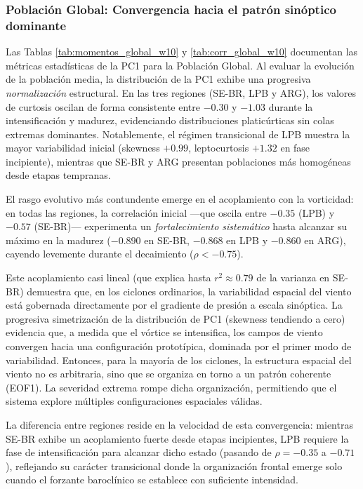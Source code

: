 \subsubsection{Población Global: Convergencia hacia el patrón sinóptico dominante}

Las Tablas \ref{tab:momentos_global_w10} y \ref{tab:corr_global_w10} documentan las métricas estadísticas de la PC1 para la Población Global. Al evaluar la evolución de la población media, la distribución de la PC1 exhibe una progresiva \textit{normalización} estructural. En las tres regiones (SE-BR, LPB y ARG), los valores de curtosis oscilan de forma consistente entre $-0.30$ y $-1.03$ durante la intensificación y madurez, evidenciando distribuciones platicúrticas sin colas extremas dominantes. Notablemente, el régimen transicional de LPB muestra la mayor variabilidad inicial (skewness $+0.99$, leptocurtosis $+1.32$ en fase incipiente), mientras que SE-BR y ARG presentan poblaciones más homogéneas desde etapas tempranas.

El rasgo evolutivo más contundente emerge en el acoplamiento con la vorticidad: en todas las regiones, la correlación inicial —que oscila entre $-0.35$ (LPB) y $-0.57$ (SE-BR)— experimenta un \textit{fortalecimiento sistemático} hasta alcanzar su máximo en la madurez ($-0.890$ en SE-BR, $-0.868$ en LPB y $-0.860$ en ARG), cayendo levemente durante el decaimiento ($\rho < -0.75$).



Este acoplamiento casi lineal (que explica hasta $r^2 \approx 0.79$ de la varianza en SE-BR) demuestra que, en los ciclones ordinarios, la variabilidad espacial del viento está gobernada directamente por el gradiente de presión a escala sinóptica. La progresiva simetrización de la distribución de PC1 (skewness tendiendo a cero) evidencia que, a medida que el vórtice se intensifica, los campos de viento convergen hacia una configuración prototípica, dominada por el primer modo de variabilidad. Entonces, para la mayoría de los ciclones, la estructura espacial del viento no es arbitraria, sino que se organiza en torno a un patrón coherente (EOF1). La severidad extrema rompe dicha organización, permitiendo que el sistema explore múltiples configuraciones espaciales válidas.

La diferencia entre regiones reside en la velocidad de esta convergencia: mientras SE-BR exhibe un acoplamiento fuerte desde etapas incipientes, LPB requiere la fase de intensificación para alcanzar dicho estado (pasando de $\rho = -0.35$ a $-0.71$), reflejando su carácter transicional donde la organización frontal emerge solo cuando el forzante baroclínico se establece con suficiente intensidad.

